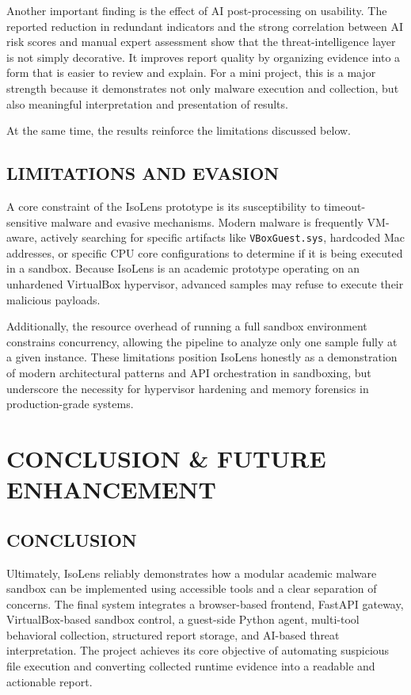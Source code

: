 \documentclass[a4paper,12pt,oneside]{report}
\begin{document}
\par

\par

Another important finding is the effect of AI post-processing on usability. The reported reduction in redundant indicators and the strong correlation between AI risk scores and manual expert assessment show that the threat-intelligence layer is not simply decorative. It improves report quality by organizing evidence into a form that is easier to review and explain. For a mini project, this is a major strength because it demonstrates not only malware execution and collection, but also meaningful interpretation and presentation of results.

At the same time, the results reinforce the limitations discussed below.

\section{LIMITATIONS AND EVASION}
A core constraint of the IsoLens prototype is its susceptibility to timeout-sensitive malware and evasive mechanisms. Modern malware is frequently VM-aware, actively searching for specific artifacts like \texttt{VBoxGuest.sys}, hardcoded Mac addresses, or specific CPU core configurations to determine if it is being executed in a sandbox. Because IsoLens is an academic prototype operating on an unhardened VirtualBox hypervisor, advanced samples may refuse to execute their malicious payloads. 

\par

\par

Additionally, the resource overhead of running a full sandbox environment constrains concurrency, allowing the pipeline to analyze only one sample fully at a given instance. These limitations position IsoLens honestly as a demonstration of modern architectural patterns and API orchestration in sandboxing, but underscore the necessity for hypervisor hardening and memory forensics in production-grade systems.

\chapter{CONCLUSION \& FUTURE ENHANCEMENT}
\section{CONCLUSION}
Ultimately, IsoLens reliably demonstrates how a modular academic malware sandbox can be implemented using accessible tools and a clear separation of concerns. The final system integrates a browser-based frontend, FastAPI gateway, VirtualBox-based sandbox control, a guest-side Python agent, multi-tool behavioral collection, structured report storage, and AI-based threat interpretation. The project achieves its core objective of automating suspicious file execution and converting collected runtime evidence into a readable and actionable report.
\end{document}
